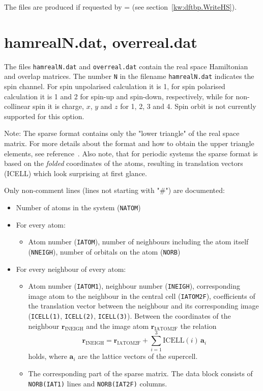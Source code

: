 The files are produced if requested by  =  (see
section~\ref{kw:dftbp.WriteHS}).

\section{hamrealN.dat, overreal.dat}
\label{sec:hamreal}
 The files \verb|hamrealN.dat|
and \verb|overreal.dat| contain the real space Hamiltonian and overlap
matrices. The number \verb|N| in the filename \verb|hamrealN.dat|
indicates the spin channel. For spin unpolarised calculation it is 1,
for spin polarised calculation it is 1 and 2 for spin-up and
spin-down, respectively, while for non-collinear spin it is charge,
$x$, $y$ and $z$ for 1, 2, 3 and 4. Spin orbit is not currently
supported for this option.

Note: The sparse format contains only the "lower triangle" of the real
space matrix. For more details about the format and how to obtain the
upper triangle elements, see reference~\cite{dftbp-2007paper}. Also note,
that for periodic systems the sparse format is based on the
\emph{folded} coordinates of the atoms, resulting in translation
vectors (ICELL) which look surprising at first glance.

Only non-comment lines (lines not starting with "\#") are documented:
\begin{itemize}
\item Number of atoms in the system (\verb|NATOM|)
\item For every atom:
  \begin{itemize}
  \item Atom number (\verb|IATOM|), number of neighbours including the
    atom itself (\verb|NNEIGH|), number of orbitals on the atom
    (\verb|NORB|)
  \end{itemize}
\item For every neighbour of every atom:
  \begin{itemize}
  \item Atom number (\verb|IATOM1|), neighbour number (\verb|INEIGH|),
    corresponding image atom to the neighbour in the central cell
    (\verb|IATOM2F|), coefficients of the translation vector between
    the neighbour and its corresponding image (\verb|ICELL(1)|,
    \verb|ICELL(2)|, \verb|ICELL(3)|). Between the coordinates of the
    neighbour $\mathbf{r}_{\text{INEIGH}}$ and the image atom
    $\mathbf{r}_{\text{IATOM2F}}$ the relation
    \begin{equation*}
      \mathbf{r}_{\text{INEIGH}} = \mathbf{r}_{\text{IATOM2F}} + \sum_{i=1}^3
      \text{ICELL}(i)\, \mathbf{a}_i
    \end{equation*}
    holds, where $\mathbf{a}_i$ are the lattice vectors of the supercell.
  \item The corresponding part of the sparse matrix. The data block
    consists of \verb|NORB(IAT1)| lines and \verb|NORB(IAT2F)| columns.
  \end{itemize}
\end{itemize}

